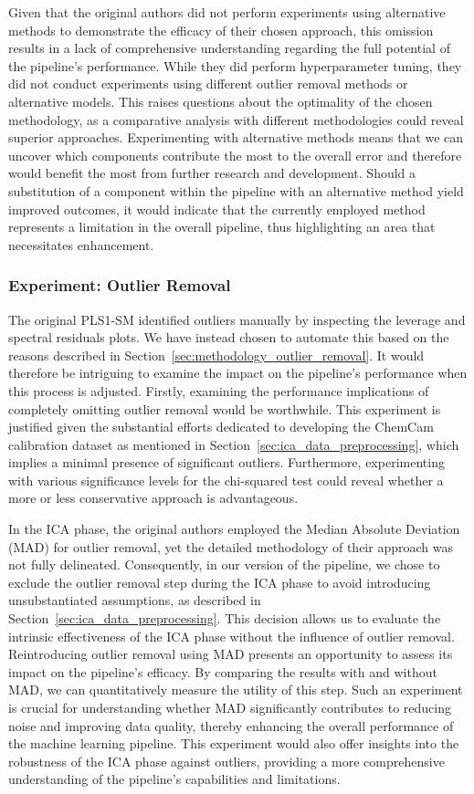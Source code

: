 \noindent
Given that the original authors did not perform experiments using alternative methods to demonstrate the efficacy of their chosen approach, this omission results in a lack of comprehensive understanding regarding the full potential of the pipeline's performance.
While they did perform hyperparameter tuning, they did not conduct experiments using different outlier removal methods or alternative models.
This raises questions about the optimality of the chosen methodology, as a comparative analysis with different methodologies could reveal superior approaches.
Experimenting with alternative methods means that we can uncover which components contribute the most to the overall error and therefore would benefit the most from further research and development.
Should a substitution of a component within the pipeline with an alternative method yield improved outcomes, it would indicate that the currently employed method represents a limitation in the overall pipeline, thus highlighting an area that necessitates enhancement.

\subsubsection{Experiment: Outlier Removal}\label{sec:experiment_outlier_removal}
The original PLS1-SM identified outliers manually by inspecting the leverage and spectral residuals plots.
We have instead chosen to automate this based on the reasons described in Section~\ref{sec:methodology_outlier_removal}.
It would therefore be intriguing to examine the impact on the pipeline's performance when this process is adjusted.
Firstly, examining the performance implications of completely omitting outlier removal would be worthwhile.
This experiment is justified given the substantial efforts dedicated to developing the ChemCam calibration dataset as mentioned in Section~\ref{sec:ica_data_preprocessing}, which implies a minimal presence of significant outliers.
Furthermore, experimenting with various significance levels for the chi-squared test could reveal whether a more or less conservative approach is advantageous.

In the ICA phase, the original authors employed the Median Absolute Deviation (MAD) for outlier removal, yet the detailed methodology of their approach was not fully delineated.
Consequently, in our version of the pipeline, we chose to exclude the outlier removal step during the ICA phase to avoid introducing unsubstantiated assumptions, as described in Section~\ref{sec:ica_data_preprocessing}.
This decision allows us to evaluate the intrinsic effectiveness of the ICA phase without the influence of outlier removal.
Reintroducing outlier removal using MAD presents an opportunity to assess its impact on the pipeline's efficacy.
By comparing the results with and without MAD, we can quantitatively measure the utility of this step.
Such an experiment is crucial for understanding whether MAD significantly contributes to reducing noise and improving data quality, thereby enhancing the overall performance of the machine learning pipeline.
This experiment would also offer insights into the robustness of the ICA phase against outliers, providing a more comprehensive understanding of the pipeline's capabilities and limitations.

